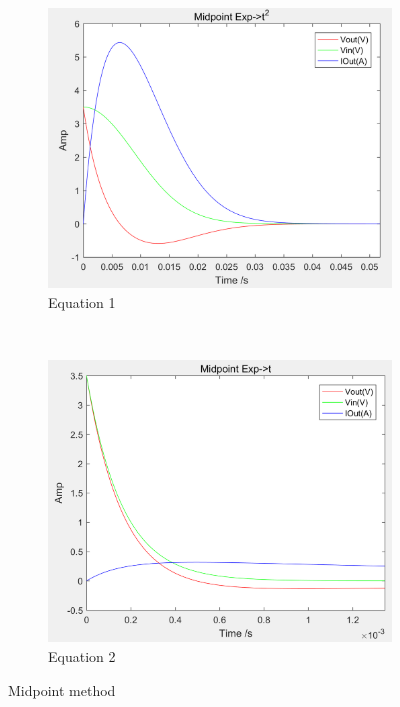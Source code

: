 \documentclass[a4paper, 12pt]{article}
\begin{document}
\begin{figure}[h]
      \centering
      \begin{subfigure}[b]{0.4\textwidth}
            \includegraphics[width=\textwidth]{ex1/Midpoint_t_sqr.PNG}
            \caption{Equation 1}
      \end{subfigure}
      ~
      \begin{subfigure}[b]{0.4\textwidth}
            \includegraphics[width=\textwidth]{ex1/Midpoint_t.PNG}
            \caption{Equation 2}
      \end{subfigure}
      \caption{Midpoint method}
\end{figure}
\end{document}
